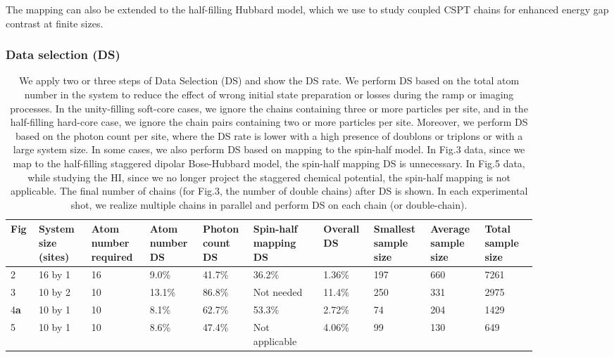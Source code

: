 \documentclass[preprint,superscriptaddress,floatfix, nofootinbib]{revtex4-2}
\begin{document}
The mapping can also be extended to the half-filling Hubbard model, which we use to study coupled CSPT chains for enhanced energy gap contrast at finite sizes.

\subsubsection*{Data selection (DS)}

\begin{table}[ht]
\begin{ruledtabular}
\begin{tabular}{p{0.04\linewidth} | p{0.09\linewidth} | p{0.1\linewidth} | p{0.09\linewidth} | p{0.08\linewidth} | p{0.12\linewidth} | p{0.08\linewidth} | p{0.09\linewidth} | p{0.09\linewidth} | p{0.09\linewidth}}
    Fig & System size (sites) & Atom number required & Atom number DS & Photon count DS & Spin-half mapping DS & Overall DS & Smallest sample size & Average sample size & Total sample size \\
    \hline
    2 & 16 by 1 & 16 & 9.0\% & 41.7\% & 36.2\% & 1.36\% & 197 & 660 & 7261 \\
    3 & 10 by 2 & 10 & 13.1\% & 86.8\% & Not needed & 11.4\% & 250 & 331 & 2975 \\
    4\textbf{a} & 10 by 1 & 10 & 8.1\% & 62.7\% & 53.3\% & 2.72\% & 74 & 204 & 1429 \\
    5 & 10 by 1 & 10 & 8.6\% & 47.4\% & Not applicable & 4.06\% & 99 & 130 & 649 
\end{tabular}
\end{ruledtabular}
\caption{\label{tab:data_size} We apply two or three steps of Data Selection (DS) and show the DS rate. We perform DS based on the total atom number in the system to reduce the effect of wrong initial state preparation or losses during the ramp or imaging processes. In the unity-filling soft-core cases, we ignore the chains containing three or more particles per site, and in the half-filling hard-core case, we ignore the chain pairs containing two or more particles per site. Moreover, we perform DS based on the photon count per site, where the DS rate is lower with a high presence of doublons or triplons or with a large system size. In some cases, we also perform DS based on mapping to the spin-half model. In Fig.3 data, since we map to the half-filling staggered dipolar Bose-Hubbard model, the spin-half mapping DS is unnecessary. In Fig.5 data, while studying the HI, since we no longer project the staggered chemical potential, the spin-half mapping is not applicable. The final number of chains (for Fig.3, the number of double chains) after DS is shown. In each experimental shot, we realize multiple chains in parallel and perform DS on each chain (or double-chain).}
\end{table}
\end{document}
